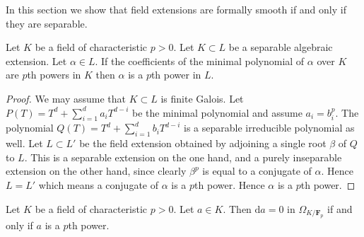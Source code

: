 \noindent
In this section we show that field extensions are formally smooth
if and only if they are separable.

\begin{lemma}
\label{lemma-pth-root}
Let $K$ be a field of characteristic $p > 0$.
Let $K \subset L$ be a separable algebraic extension.
Let $\alpha \in L$.
If the coefficients of the minimal polynomial of $\alpha$
over $K$ are $p$th powers in $K$ then $\alpha$ is a $p$th
power in $L$.
\end{lemma}

\begin{proof}
We may assume that $K \subset L$ is finite Galois.
Let $P(T) = T^d + \sum\nolimits_{i = 1}^d a_i T^{d - i}$
be the minimal polynomial and assume $a_i = b_i^p$.
The polynomial $Q(T) = T^d + \sum\nolimits_{i = 1}^d b_i T^{d - i}$
is a separable irreducible polynomial as well.
Let $L \subset L'$ be the field extension obtained by adjoining
a single root $\beta$ of $Q$ to $L$. This is a separable 
extension on the one hand, and a purely inseparable extension
on the other hand, since clearly $\beta^p$ is equal to a conjugate of
$\alpha$. Hence $L = L'$ which means a conjugate of $\alpha$ is
a $p$th power. Hence $\alpha$ is a $p$th power.
\end{proof}

\begin{lemma}
\label{lemma-derivative-zero-pth-power}
Let $K$ be a field of characteristic $p > 0$.
Let $a \in K$. Then $\text{d}a = 0$ in $\Omega_{K/\mathbf{F}_p}$
if and only if $a$ is a $p$th power.
\end{lemma}

